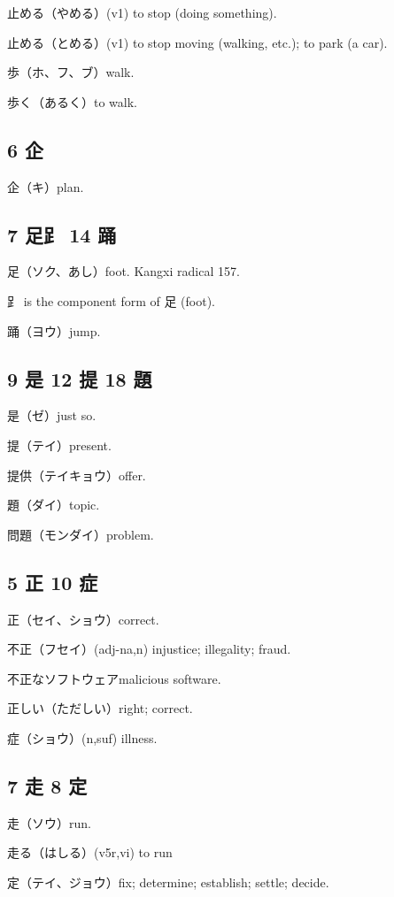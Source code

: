 止める（やめる）(v1) to stop (doing something).

止める（とめる）(v1) to stop moving (walking, etc.); to park (a car).

歩（ホ、フ、ブ）walk.

歩く（あるく）to walk.

\subsection{6 企}

企（キ）plan.

\subsection{7 足⻊ 14 踊}

足（ソク、あし）foot.
Kangxi radical 157.

⻊ is the component form of 足 (foot).

踊（ヨウ）jump.

\subsection{9 是 12 提 18 題}

是（ゼ）just so.

提（テイ）present.

提供（テイキョウ）offer.

題（ダイ）topic.

問題（モンダイ）problem.

\subsection{5 正 10 症}

正（セイ、ショウ）correct.

不正（フセイ）(adj-na,n) injustice; illegality; fraud.

不正なソフトウェアmalicious software.

正しい（ただしい）right; correct.

症（ショウ）(n,suf) illness.

\subsection{7 走 8 定}

走（ソウ）run.

走る（はしる）(v5r,vi) to run

定（テイ、ジョウ）fix; determine; establish; settle; decide.


